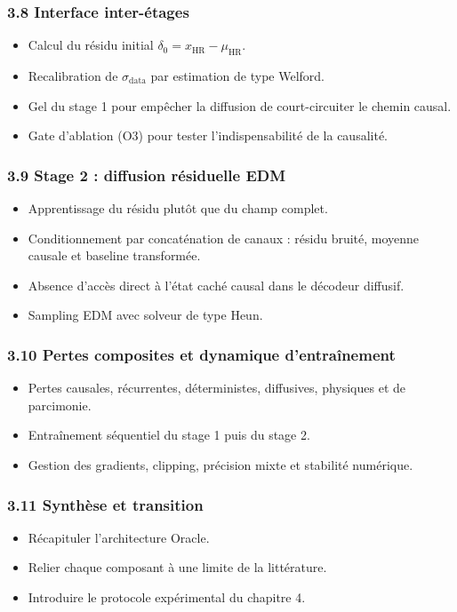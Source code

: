 \documentclass[12pt,a4paper]{article}
\begin{document}
\subsubsection*{3.8 Interface inter-\'etages}
\begin{itemize}
    \item Calcul du r\'esidu initial $\delta_0 = x_{\mathrm{HR}} - \mu_{\mathrm{HR}}$.
    \item Recalibration de $\sigma_{\mathrm{data}}$ par estimation de type Welford.
    \item Gel du stage 1 pour emp\^echer la diffusion de court-circuiter le chemin causal.
    \item Gate d'ablation (O3) pour tester l'indispensabilit\'e de la causalit\'e.
\end{itemize}

\subsubsection*{3.9 Stage 2 : diffusion r\'esiduelle EDM}
\begin{itemize}
    \item Apprentissage du r\'esidu plut\^ot que du champ complet.
    \item Conditionnement par concat\'enation de canaux : r\'esidu bruit\'e, moyenne causale et baseline transform\'ee.
    \item Absence d'acc\`es direct \`a l'\'etat cach\'e causal dans le d\'ecodeur diffusif.
    \item Sampling EDM avec solveur de type Heun.
\end{itemize}

\subsubsection*{3.10 Pertes composites et dynamique d'entra\^inement}
\begin{itemize}
    \item Pertes causales, r\'ecurrentes, d\'eterministes, diffusives, physiques et de parcimonie.
    \item Entra\^inement s\'equentiel du stage 1 puis du stage 2.
    \item Gestion des gradients, clipping, pr\'ecision mixte et stabilit\'e num\'erique.
\end{itemize}

\subsubsection*{3.11 Synth\`ese et transition}
\begin{itemize}
    \item R\'ecapituler l'architecture Oracle.
    \item Relier chaque composant \`a une limite de la litt\'erature.
    \item Introduire le protocole exp\'erimental du chapitre 4.
\end{itemize}
\end{document}
